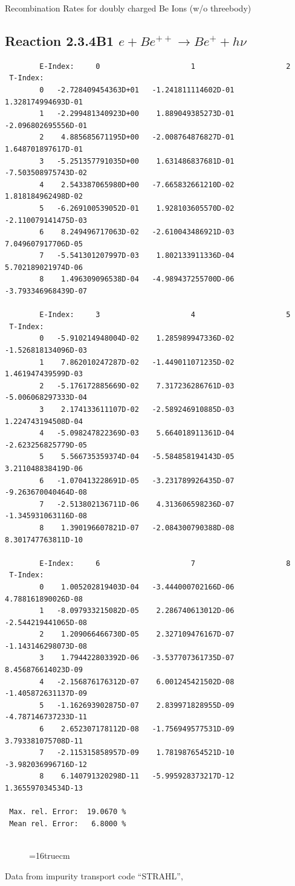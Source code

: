 \documentclass[12pt,dvips]{article}
\begin{document}
  Recombination Rates for doubly charged Be Ions (w/o threebody)
\subsection{
Reaction 2.3.4B1  $e + Be^{++} \rightarrow Be^+ + h\nu$
}

\begin{small}\begin{verbatim}
        E-Index:     0                     1                     2
 T-Index:
        0   -2.728409454363D+01   -1.241811114602D-01    1.328174994693D-01
        1   -2.299481340923D+00    1.889049385273D-01   -2.096802695556D-01
        2    4.885685671195D+00   -2.008764876827D-01    1.648701897617D-01
        3   -5.251357791035D+00    1.631486837681D-01   -7.503508975743D-02
        4    2.543387065980D+00   -7.665832661210D-02    1.818184962498D-02
        5   -6.269100539052D-01    1.928103605570D-02   -2.110079141475D-03
        6    8.249496717063D-02   -2.610043486921D-03    7.049607917706D-05
        7   -5.541301207997D-03    1.802133911336D-04    5.702189021974D-06
        8    1.496309096538D-04   -4.989437255700D-06   -3.793346968439D-07

        E-Index:     3                     4                     5
 T-Index:
        0   -5.910214948004D-02    1.285989947336D-02   -1.526818134096D-03
        1    7.862010247287D-02   -1.449011071235D-02    1.461947439599D-03
        2   -5.176172885669D-02    7.317236286761D-03   -5.006068297333D-04
        3    2.174133611107D-02   -2.589246910885D-03    1.224743194508D-04
        4   -5.098247822369D-03    5.664018911361D-04   -2.623256825779D-05
        5    5.566735359374D-04   -5.584858194143D-05    3.211048838419D-06
        6   -1.070413228691D-05   -3.231789926435D-07   -9.263670040464D-08
        7   -2.513802136711D-06    4.313606598236D-07   -1.345931063116D-08
        8    1.390196607821D-07   -2.084300790388D-08    8.301747763811D-10

        E-Index:     6                     7                     8
 T-Index:
        0    1.005202819403D-04   -3.444000702166D-06    4.788161890026D-08
        1   -8.097933215082D-05    2.286740613012D-06   -2.544219441065D-08
        2    1.209066466730D-05    2.327109476167D-07   -1.143146298073D-08
        3    1.794422803392D-06   -3.537707361735D-07    8.456876614023D-09
        4   -2.156876176312D-07    6.001245421502D-08   -1.405872631137D-09
        5   -1.162693902875D-07    2.839971828955D-09   -4.787146737233D-11
        6    2.652307178112D-08   -1.756949577531D-09    3.793381075708D-11
        7   -2.115315858957D-09    1.781987654521D-10   -3.982036996716D-12
        8    6.140791320298D-11   -5.995928373217D-12    1.365597034534D-13

 Max. rel. Error:  19.0670 %
 Mean rel. Error:   6.8000 %


\end{verbatim}\end{small}
\begin{figure} \label{2.3.4B1}
\epsfxsize=16truecm
\end{figure}
\newpage
Data from impurity transport code ``STRAHL'', \cite{kn:Behringer}
\end{document}
